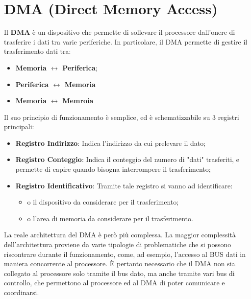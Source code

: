 \section{DMA (Direct Memory Access)}\label{par:DMA}
Il \textbf{DMA} è un dispositivo che permette di sollevare il processore dall'onere di trasferire i dati tra varie periferiche. In particolare, il DMA permette di gestire il trasferimento dati tra:
\begin{itemize}
    \item \textbf{Memoria $\leftrightarrow$ Periferica};
    \item \textbf{Periferica $\leftrightarrow$ Memoria}
    \item \textbf{Memoria $\leftrightarrow$ Memroia}
\end{itemize}

Il suo principio di funzionamento è semplice, ed è schematizzabile su 3 registri principali:
\begin{itemize}
    \item \textbf{Registro Indirizzo}: Indica l'indirizzo da cui prelevare il dato;
    \item \textbf{Registro Conteggio}: Indica il conteggio del numero di "dati" trasferiti, e permette di capire quando bisogna interrompere il trasferimento;
    \item \textbf{Registro Identificativo}: Tramite tale registro si vanno ad identificare:
    \begin{itemize}
        \item o il dispositivo da considerare per il trasferimento;
        \item o l'area di memoria da considerare per il trasferimento.
    \end{itemize}  

\end{itemize}

La reale architettura del DMA è però più complessa. La maggior complessità dell'architettura proviene da varie tipologie di problematiche che si possono riscontrare durante il funzionamento, come, ad esempio, l'accesso al BUS dati in maniera concorrente al processore. \uppercase{è} pertanto necessario che il DMA non sia collegato al processore solo tramite il bus dato, ma anche tramite vari bus di controllo, che permettono al processore ed al DMA di poter comunicare e coordinarsi.

